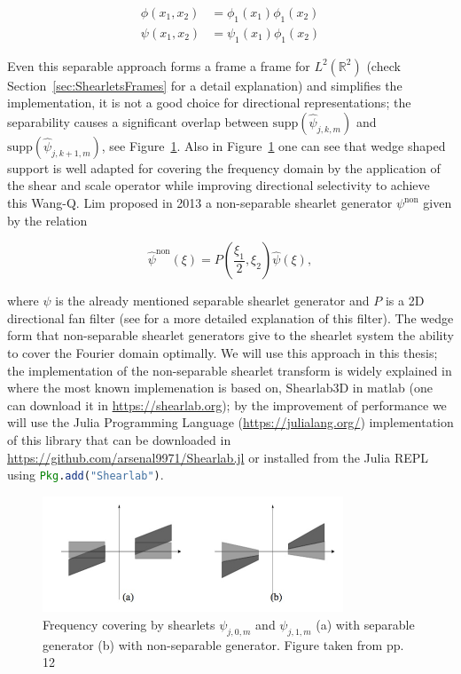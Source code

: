 $$
\begin{aligned}
\phi(x_1,x_2)&=\phi_1(x_1)\phi_1(x_2)\\
\psi(x_1,x_2)&=\psi_1(x_1)\phi_1(x_2)
\end{aligned}
$$

Even this separable approach forms a frame a frame for $L^2(\mathbb{R}^2)$ (check Section~\ref{sec:ShearletsFrames} for a detail explanation) and simplifies the implementation, it is not a good choice for directional representations; the separability causes a significant overlap between $\text{supp}(\hat{\psi}_{j,k,m})$ and $\text{supp}(\hat{\psi}_{j,k+1,m})$, see Figure~\ref{fig:separable_nonseparable}. Also in Figure~\ref{fig:separable_nonseparable} one can see that wedge shaped support is well adapted for covering the frequency domain by the application of the shear and scale operator while improving directional selectivity to achieve this Wang-Q. Lim proposed in 2013 a non-separable shearlet generator $\psi^{\text{non}}$ given by the relation

$$
\hat{\psi}^{\text{non}}(\xi)=P\left(\frac{\xi_1}{2},\xi_2\right)\hat{\psi}(\xi),
$$

where $\psi$ is the already mentioned separable shearlet generator and $P$ is a 2D directional fan filter (see \cite{Nonseparableshear} for a more detailed explanation of this filter). The wedge form that non-separable shearlet generators give to the shearlet system the ability to cover the Fourier domain optimally. We will use this approach in this thesis; the implementation of the non-separable shearlet transform is widely explained in \cite{Shearlab} where the most known implemenation is based on, Shearlab3D in matlab (one can download it in \url{https://shearlab.org}); by the improvement of performance we will use the Julia Programming Language (\url{https://julialang.org/}) implementation of this library that can be downloaded in \url{https://github.com/arsenal9971/Shearlab.jl} or installed from the Julia REPL using \lstinline[language=julia]{Pkg.add("Shearlab")}.

\begin{figure}[h!]
\centering
\includegraphics[width=0.8\textwidth]{./Diagrams/separable_nonseparable.jpg}
\caption{Frequency covering by shearlets $\psi_{j,0,m}$ and $\psi_{j,1,m}$ (a) with separable generator (b) with non-separable generator. Figure taken from \cite{Nonseparableshear} pp. 12}
\label{fig:separable_nonseparable}
\end{figure}

